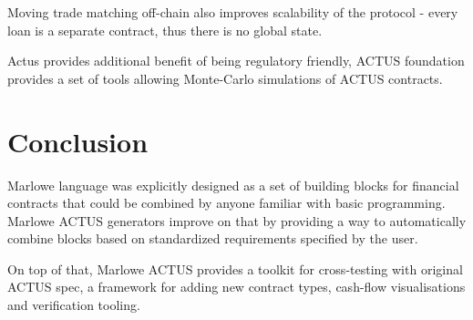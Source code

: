 \documentclass[runningheads]{llncs}
\begin{document}
Moving trade matching off-chain also improves scalability of the protocol
- every loan is a separate contract, thus there is no global state.

Actus provides additional benefit of being regulatory friendly, ACTUS
foundation provides a set of tools allowing Monte-Carlo simulations
of ACTUS contracts.

\section{Conclusion}
\label{conclusion}

Marlowe language was explicitly designed as a set of building blocks
for financial contracts that could be combined by anyone familiar
with basic programming. Marlowe ACTUS generators improve on that by
providing a way to automatically combine blocks based on standardized
requirements specified by the user.

On top of that, Marlowe ACTUS provides a toolkit for cross-testing
with original ACTUS spec, a framework for adding new contract types,
cash-flow visualisations and verification tooling.

%
%
%


%
\end{document}
